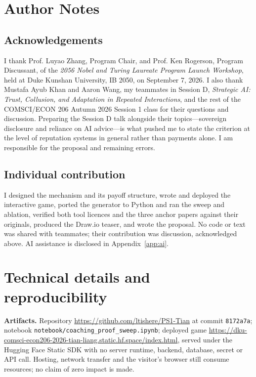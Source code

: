 \clearpage\nobalance
\section*{Author Notes}
\subsection*{Acknowledgements}
I thank Prof. Luyao Zhang, Program Chair, and Prof. Ken Rogerson, Program Discussant, of the \emph{2056 Nobel and Turing Laureate Program Launch Workshop}, held at Duke Kunshan University, IB 2050, on September 7, 2026. I also thank Mustafa Ayub Khan and Aaron Wang, my teammates in Session D, \emph{Strategic AI: Trust, Collusion, and Adaptation in Repeated Interactions}, and the rest of the COMSCI/ECON 206 Autumn 2026 Session 1 class for their questions and discussion. Preparing the Session D talk alongside their topics---sovereign disclosure and reliance on AI advice---is what pushed me to state the criterion at the level of reputation systems in general rather than payments alone. I am responsible for the proposal and remaining errors.

\subsection*{Individual contribution}
I designed the mechanism and its payoff structure, wrote and deployed the interactive game, ported the generator to Python and ran the sweep and ablation, verified both tool licences and the three anchor papers against their originals, produced the Draw.io teaser, and wrote the proposal. No code or text was shared with teammates; their contribution was discussion, acknowledged above. AI assistance is disclosed in Appendix~\ref{app:ai}.


\appendix
\section{Technical details and reproducibility}
\label{app:tech}

\textbf{Artifacts.} Repository \url{https://github.com/ltishere/PS1-Tian} at commit \texttt{8172a7a}; notebook \texttt{notebook/coaching\_proof\_sweep.ipynb}; deployed game \url{https://dku-comsci-econ206-2026-tian-liang.static.hf.space/index.html}, served under the Hugging Face Static SDK with no server runtime, backend, database, secret or API call. Hosting, network transfer and the visitor's browser still consume resources; no claim of zero impact is made.

